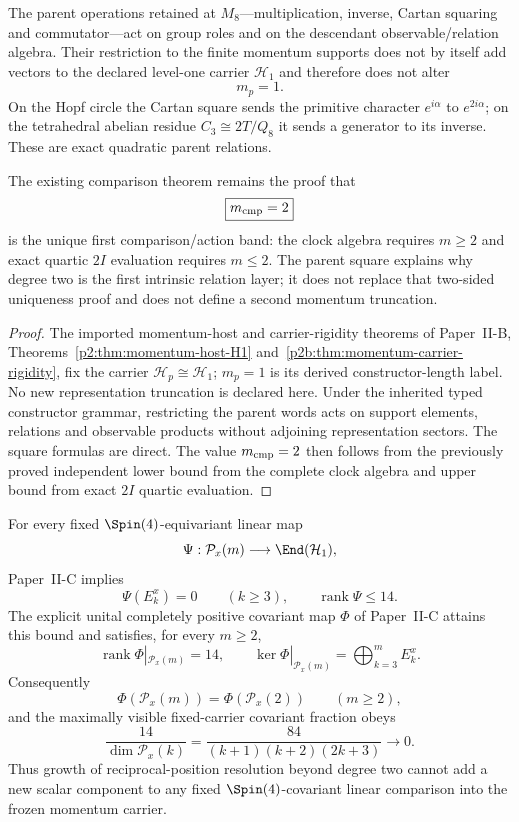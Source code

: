 \documentclass[12pt,a4paper]{article}
\begin{document}
\begin{theorem}[Relation closure does not enlarge $m_p=1$]
\label{p4:thm:v188-relation-closure-not-carrier}
The parent operations retained at $M_8$---multiplication, inverse, Cartan
squaring and commutator---act on group roles and on the descendant
observable/relation algebra.  Their restriction to the finite momentum
supports does not by itself add vectors to the declared level-one carrier
$\mathcal H_1$ and therefore does not alter
\[
 \boxed{m_p=1.}
\]
On the Hopf circle the Cartan square sends the primitive character
$e^{i\alpha}$ to $e^{2i\alpha}$; on the tetrahedral abelian residue
$C_3\cong2T/Q_8$ it sends a generator to its inverse.  These are exact
quadratic parent relations.

The existing comparison theorem remains the proof that
\[
 \boxed{m_{\rm cmp}=2}
\]
is the unique first comparison/action band: the clock algebra requires
$m\ge2$ and exact quartic $2I$ evaluation requires $m\le2$.  The parent square
explains why degree two is the first intrinsic relation layer; it does not
replace that two-sided uniqueness proof and does not define a second momentum
truncation.
\end{theorem}

\begin{proof}
The imported momentum-host and carrier-rigidity theorems of Paper~II-B,
Theorems~\ref{p2:thm:momentum-host-H1}
and~\ref{p2b:thm:momentum-carrier-rigidity}, fix the carrier
$\mathcal H_p\cong\mathcal H_1$; $m_p=1$ is its derived constructor-length
label.  No new representation truncation is declared here.  Under the
inherited typed constructor grammar, restricting the parent words acts on
support elements, relations and observable products without adjoining
representation sectors.  The square formulas are direct.
The value $m_{\rm cmp}=2$ then follows from the previously proved independent
lower bound from the complete clock algebra and upper bound from exact $2I$
quartic evaluation.
\end{proof}

\begin{theorem}
\label{p4:thm:v260-degree-two-covariant-saturation}
For every fixed $\Spin(4)$-equivariant linear map
\[
 \Psi:\mathcal P_x(m)\longrightarrow\End(\mathcal H_1),
\]
Paper~II-C implies
\[
 \Psi(E_k^x)=0\qquad(k\ge3),
 \qquad
 \operatorname{rank}\Psi\le14.
\]
The explicit unital completely positive covariant map $\Phi$ of Paper~II-C
attains this bound and satisfies, for every $m\ge2$,
\[
 \boxed{
 \operatorname{rank}\Phi|_{\mathcal P_x(m)}=14,
 \qquad
 \ker\Phi|_{\mathcal P_x(m)}=\bigoplus_{k=3}^{m}E_k^x.}
\]
Consequently
\[
 \boxed{
 \Phi(\mathcal P_x(m))=\Phi(\mathcal P_x(2))\qquad(m\ge2),}
\]
and the maximally visible fixed-carrier covariant fraction obeys
\[
 \boxed{
 \frac{14}{\dim\mathcal P_x(k)}
 =\frac{84}{(k+1)(k+2)(2k+3)}\longrightarrow0.}
\]
Thus growth of reciprocal-position resolution beyond degree two cannot add a
new scalar component to any fixed $\Spin(4)$-covariant linear comparison into
the frozen momentum carrier.
\end{theorem}
\end{document}

